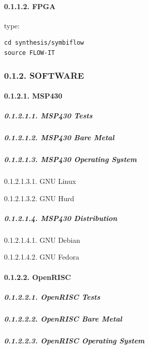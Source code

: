 \documentclass[
]{article}
\begin{document}
\hypertarget{fpga}{%
\paragraph{0.1.1.2. FPGA}\label{fpga}}

type:

\begin{verbatim}
cd synthesis/symbiflow
source FLOW-IT
\end{verbatim}

\hypertarget{software}{%
\subsubsection{0.1.2. SOFTWARE}\label{software}}

\hypertarget{msp430}{%
\paragraph{0.1.2.1. MSP430}\label{msp430}}

\hypertarget{msp430-tests}{%
\subparagraph{0.1.2.1.1. MSP430 Tests}\label{msp430-tests}}

\hypertarget{msp430-bare-metal}{%
\subparagraph{0.1.2.1.2. MSP430 Bare Metal}\label{msp430-bare-metal}}

\hypertarget{msp430-operating-system}{%
\subparagraph{0.1.2.1.3. MSP430 Operating
System}\label{msp430-operating-system}}

0.1.2.1.3.1. GNU Linux

0.1.2.1.3.2. GNU Hurd

\hypertarget{msp430-distribution}{%
\subparagraph{0.1.2.1.4. MSP430
Distribution}\label{msp430-distribution}}

0.1.2.1.4.1. GNU Debian

0.1.2.1.4.2. GNU Fedora

\hypertarget{openrisc}{%
\paragraph{0.1.2.2. OpenRISC}\label{openrisc}}

\hypertarget{openrisc-tests}{%
\subparagraph{0.1.2.2.1. OpenRISC Tests}\label{openrisc-tests}}

\hypertarget{openrisc-bare-metal}{%
\subparagraph{0.1.2.2.2. OpenRISC Bare
Metal}\label{openrisc-bare-metal}}

\hypertarget{openrisc-operating-system}{%
\subparagraph{0.1.2.2.3. OpenRISC Operating
System}\label{openrisc-operating-system}}
\end{document}
